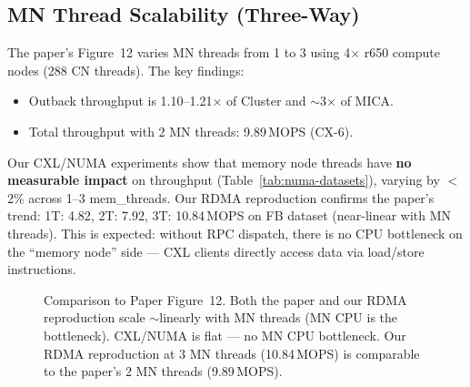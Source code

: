 \documentclass[conference]{IEEEtran}
\begin{document}
\subsection{MN Thread Scalability (Three-Way)}

The paper's Figure~12 varies MN threads from 1 to 3 using 4$\times$ r650 compute nodes (288 CN threads). The key findings:
\begin{itemize}[nosep]
  \item Outback throughput is 1.10--1.21$\times$ of Cluster and $\sim$3$\times$ of MICA.
  \item Total throughput with 2 MN threads: 9.89\,MOPS (CX-6).
\end{itemize}

Our CXL/NUMA experiments show that memory node threads have \textbf{no measurable impact} on throughput (Table~\ref{tab:numa-datasets}), varying by $<$2\% across 1--3 mem\_threads. Our RDMA reproduction confirms the paper's trend: 1T: 4.82, 2T: 7.92, 3T: 10.84\,MOPS on FB dataset (near-linear with MN threads). This is expected: without RPC dispatch, there is no CPU bottleneck on the ``memory node'' side --- CXL clients directly access data via load/store instructions.

\begin{figure}[H]
\centering
{}
\caption{Comparison to Paper Figure~12. Both the paper and our RDMA reproduction scale $\sim$linearly with MN threads (MN CPU is the bottleneck). CXL/NUMA is flat --- no MN CPU bottleneck. Our RDMA reproduction at 3 MN threads (10.84\,MOPS) is comparable to the paper's 2 MN threads (9.89\,MOPS).}
\label{fig:paper-fig12-cmp}
\end{figure}
\end{document}
